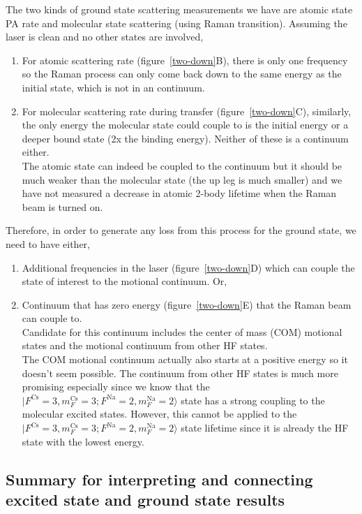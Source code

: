 \documentclass[10pt,fleqn]{article}
\begin{document}
The two kinds of ground state scattering measurements we have are atomic state PA rate
and molecular state scattering (using Raman transition).
Assuming the laser is clean and no other states are involved,
\begin{enumerate}
\item For atomic scattering rate (\mbox{figure \ref{two-down}B}), there is only
  one frequency so the Raman process can only come back down to the same energy as
  the initial state, which is not in an continuum.
\item For molecular scattering rate during transfer (\mbox{figure \ref{two-down}C}),
  similarly, the only energy the molecular state could couple to is the initial energy
  or a deeper bound state (2x the binding energy). Neither of these is a continuum either.\\
  The atomic state can indeed be coupled to the continuum but it should be much weaker than
  the molecular state (the up leg is much smaller) and we have not measured a decrease in
  atomic 2-body lifetime when the Raman beam is turned on.
\end{enumerate}
Therefore, in order to generate any loss from this process for the ground state,
we need to have either,
\begin{enumerate}
\item Additional frequencies in the laser (\mbox{figure \ref{two-down}D}) which
  can couple the state of interest to the motional continuum. Or,
\item Continuum that has zero energy (\mbox{figure \ref{two-down}E}) that the Raman beam
  can couple to.\\
  Candidate for this continuum includes the center of mass (COM) motional states and
  the motional continuum from other HF states.\\
  The COM motional continuum actually also starts at a positive energy so it doesn't seem
  possible. The continuum from other HF states is much more promising especially since
  we know that the $|F^{\mathrm{Cs}}\!=\!3, m_{F}^{\mathrm{Cs}}\!=\!3; F^{\mathrm{Na}}\!=\!2, m_{F}^{\mathrm{Na}}\!=\!2\rangle$ state has a strong coupling to the molecular excited states.
  However, this cannot be applied to the $|F^{\mathrm{Cs}}\!=\!3, m_{F}^{\mathrm{Cs}}\!=\!3; F^{\mathrm{Na}}\!=\!2, m_{F}^{\mathrm{Na}}\!=\!2\rangle$ state lifetime since it is already
  the HF state with the lowest energy.
\end{enumerate}

\subsection{Summary for interpreting and connecting excited state and ground state results}
\end{document}
